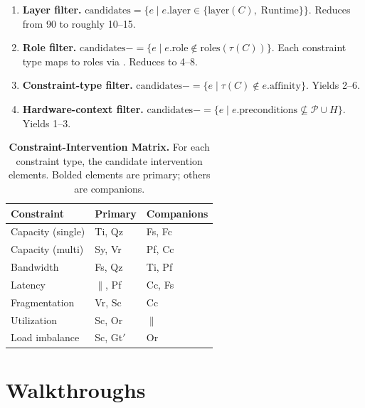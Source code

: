 \documentclass[10pt,twocolumn]{article}
\newcommand{\tablebody}{\footnotesize}
\begin{document}
\begin{enumerate}[nosep, leftmargin=*]
\item \textbf{Layer filter.} $\text{candidates} = \{e \mid e.\text{layer} \in \{\text{layer}(C),\; \text{Runtime}\}\}$. Reduces from 90 to roughly 10--15.

\item \textbf{Role filter.} $\text{candidates} \mathrel{{-}{=}} \{e \mid e.\text{role} \notin \text{roles}(\tau(C))\}$. Each constraint type maps to roles via . Reduces to 4--8.

\item \textbf{Constraint-type filter.} $\text{candidates} \mathrel{{-}{=}} \{e \mid \tau(C) \notin e.\text{affinity}\}$. Yields 2--6.

\item \textbf{Hardware-context filter.} $\text{candidates} \mathrel{{-}{=}} \{e \mid e.\text{preconditions} \not\subseteq \mathcal{P} \cup H\}$. Yields 1--3.
\end{enumerate}

\begin{table}[t]
\tablebody
\centering
\caption{\textbf{Constraint-Intervention Matrix.} For each constraint type, the candidate intervention elements. Bolded elements are primary; others are companions.}
\label{tab:resolution-matrix}
\begin{tabularx}{\columnwidth}{@{} l l X @{}}
\toprule
\textbf{Constraint} & \textbf{Primary} & \textbf{Companions} \\
\midrule
Capacity (single) & Ti, Qz & Fs, Fc \\
Capacity (multi)  & Sy, Vr & Pf, Cc \\
Bandwidth         & Fs, Qz & Ti, Pf \\
Latency           & $\parallel$, Pf & Cc, Fs \\
Fragmentation     & Vr, Sc & Cc \\
Utilization       & Sc, Or & $\parallel$ \\
Load imbalance    & Sc, Gt$'$ & Or \\
\bottomrule
\end{tabularx}
\end{table}

\section{Walkthroughs}
\label{sec:walkthrough}
\end{document}
